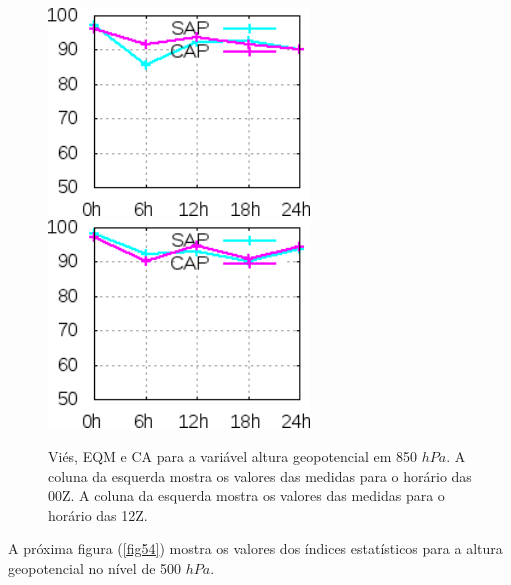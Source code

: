 \begin{figure}[!hbp]
\includegraphics[height=5.5cm]{./figs/CA850zgeo0Z.png}\includegraphics[height=5.5cm]{./figs/CA850zgeo12Z.png}
\caption{Viés, EQM e CA para a variável altura geopotencial em 850 $hPa$. A coluna da esquerda mostra os valores das medidas para o horário das 00Z. A coluna da esquerda mostra os valores das medidas para o horário das 12Z.}
\label{fig53}
\end{figure}

A próxima figura (\autoref{fig54}) mostra os valores dos índices estatísticos para a altura geopotencial no nível de 500 $hPa$.

